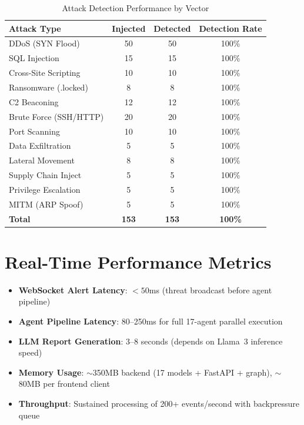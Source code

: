 \documentclass[12pt, a4paper]{report}
\begin{document}
\begin{table}[H]
\centering
\caption{Attack Detection Performance by Vector}
\label{tab:detection_results}
\begin{tabular}{l c c c}
\toprule
\textbf{Attack Type} & \textbf{Injected} & \textbf{Detected} & \textbf{Detection Rate} \\
\midrule
DDoS (SYN Flood) & 50 & 50 & 100\% \\
SQL Injection & 15 & 15 & 100\% \\
Cross-Site Scripting & 10 & 10 & 100\% \\
Ransomware (.locked) & 8 & 8 & 100\% \\
C2 Beaconing & 12 & 12 & 100\% \\
Brute Force (SSH/HTTP) & 20 & 20 & 100\% \\
Port Scanning & 10 & 10 & 100\% \\
Data Exfiltration & 5 & 5 & 100\% \\
Lateral Movement & 8 & 8 & 100\% \\
Supply Chain Inject & 5 & 5 & 100\% \\
Privilege Escalation & 5 & 5 & 100\% \\
MITM (ARP Spoof) & 5 & 5 & 100\% \\
\midrule
\textbf{Total} & \textbf{153} & \textbf{153} & \textbf{100\%} \\
\bottomrule
\end{tabular}
\end{table}

\section{Real-Time Performance Metrics}

\begin{itemize}
    \item \textbf{WebSocket Alert Latency}: $< 50$ms (threat broadcast before agent pipeline)
    \item \textbf{Agent Pipeline Latency}: 80--250ms for full 17-agent parallel execution
    \item \textbf{LLM Report Generation}: 3--8 seconds (depends on Llama~3 inference speed)
    \item \textbf{Memory Usage}: $\sim$350MB backend (17 models + FastAPI + graph), $\sim$80MB per frontend client
    \item \textbf{Throughput}: Sustained processing of 200+ events/second with backpressure queue
\end{itemize}
\end{document}
